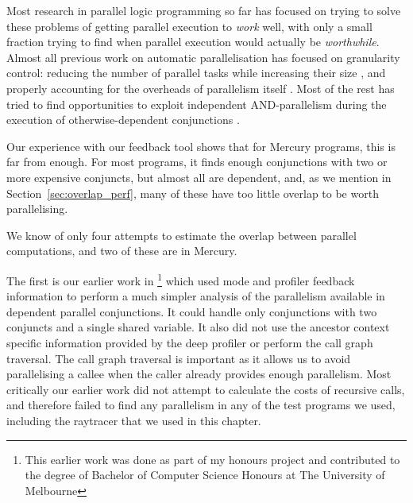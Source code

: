 
Most research in parallel logic programming so far
has focused on trying to solve these problems
of getting parallel execution to \emph{work} well,
with only a small fraction trying to find
when parallel execution would actually be \emph{worthwhile}.
Almost all previous work on automatic parallelisation
has focused on granularity control:
reducing the number of parallel tasks while increasing their size
\citep{lopez96:distance_granularity},
and properly accounting for the overheads
of parallelism itself \citep{shen_98_granularity-control}.
Most of the rest has tried to find opportunities
to exploit independent AND-parallelism
during the execution of otherwise-dependent conjunctions
\citep{DBLP:journals/jlp/MuthukumarBBH99,DBLP:conf/lopstr/CasasCH07}.

Our experience with our feedback tool shows that
for Mercury programs, this is far from enough.
For most programs,
it finds enough conjunctions with two or more expensive conjuncts,
but almost all are dependent,
and, as we mention in Section~\ref{sec:overlap_perf},
many of these have too little overlap to be worth parallelising.

We know of only four attempts to estimate the overlap
between parallel computations,
and two of these are in Mercury.

The first is our earlier work in \citet*{bone:2008:hons}\footnote{
    This earlier work was done as part of my honours project and contributed
    to the degree of Bachelor of Computer Science Honours at The University of
    Melbourne}
which used mode and profiler feedback information to perform a much simpler
analysis of the parallelism available in dependent parallel conjunctions.
It could handle only conjunctions with two conjuncts and a single shared
variable.
It also did not use the ancestor context specific information provided by the
deep profiler or perform the call graph traversal.
The call graph traversal is important as it allows us to avoid parallelising
a callee when the caller already provides enough parallelism.
Most critically our earlier work did not attempt to calculate the costs of
recursive calls,
and therefore failed to find any parallelism in any of the test programs we
used,
including the raytracer that we used in this chapter.

